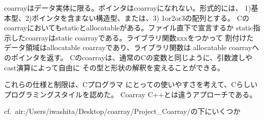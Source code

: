coarrayはデータ実体に限る。ポインタはcoarrayになれない。形式的には、
1)基本型、2)ポインタを含まない構造型、または、3) 1or2or3の配列とする。
Cのcoarrayにおいてもstaticとallocatableがある。ファイル直下で宣言するか
static指示したcoarrayはstatic coarrayである。ライブラリ関数xxxをつかって
割付けたデータ領域はallocatable coarrayであり、ライブラリ関数は
allocatable coarrayへのポインタを返す。
Cのcoarrayは、通常のCの変数と同じように、引数渡しやcast演算によって自由に
その型と形状の解釈を変えることができる。

これらの仕様と制限は、Cプログラマ
にとっての使いやすさを考えて、Cらしいプログラミングスタイルを認めた。
Coarray C++とは違うアプローチである。

cf.\ air:/Users/iwashita/Desktop/coarray/Project\_Coarray/の下にいくつか
